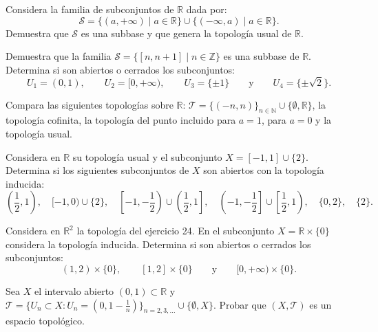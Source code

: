 \begin{ejer}[29]
Considera la familia de subconjuntos de $\mathbb{R}$ dada por:
\[
    \mathcal{S} = \{(a, +\infty) \mid a \in \mathbb{R}\} \cup \{(-\infty, a) \mid a \in \mathbb{R}\}.
\]
Demuestra que $\mathcal{S}$ es una subbase y que genera la topología usual de $\mathbb{R}$.
\end{ejer}

\begin{ejer}[30]
Demuestra que la familia $\mathcal{S} = \{[n, n+1] \mid n \in \mathbb{Z}\}$ es una subbase de $\mathbb{R}$. Determina si son abiertos o cerrados los subconjuntos:
\[
    U_1 = (0,1), \qquad U_2 = [0, +\infty), \qquad U_3 = \{\pm 1\} \qquad \text{y} \qquad U_4 = \{\pm\sqrt{2}\}.
\]
\end{ejer}

\begin{ejer}[31]
Compara las siguientes topologías sobre $\mathbb{R}$: $\mathcal{T} = \{(-n, n)\}_{n \in \mathbb{N}} \cup \{\emptyset, \mathbb{R}\}$, la topología cofinita, la topología del punto incluido para $a = 1$, para $a = 0$ y la topología usual.
\end{ejer}

\begin{ejer}[32]
Considera en $\mathbb{R}$ su topología usual y el subconjunto $X = [-1,1] \cup \{2\}$. Determina si los siguientes subconjuntos de $X$ son abiertos con la topología inducida:
\[
    \left(\frac{1}{2}, 1\right), \quad [-1, 0) \cup \{2\}, \quad \left[-1, -\frac{1}{2}\right) \cup \left(\frac{1}{2}, 1\right], \quad \left(-1, -\frac{1}{2}\right] \cup \left[\frac{1}{2}, 1\right), \quad \{0, 2\}, \quad \{2\}.
\]
\end{ejer}

\begin{ejer}[33]
Considera en $\mathbb{R}^2$ la topología del ejercicio 24. En el subconjunto $X = \mathbb{R} \times \{0\}$ considera la topología inducida. Determina si son abiertos o cerrados los subconjuntos:
\[
    (1,2) \times \{0\}, \qquad [1,2] \times \{0\} \qquad \text{y} \qquad [0, +\infty) \times \{0\}.
\]
\end{ejer}

\begin{ejer}[34]
Sea $X$ el intervalo abierto $(0,1) \subset \mathbb{R}$ y $\mathcal{T} = \{U_n \subset X : U_n = (0, 1 - \frac{1}{n})\}_{n=2,3,\dots} \cup \{\emptyset, X\}$. Probar que $(X, \mathcal{T})$ es un espacio topológico.
\end{ejer}

